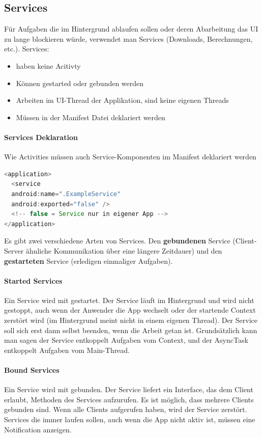 \subsection{Services}
Für Aufgaben die im Hintergrund ablaufen sollen oder deren Abarbeitung das UI zu lange blockieren würde, verwendet man Services (Downloads, Berechnungen, etc.). Services:
\begin{itemize}
\item haben keine Acitivty
\item Können gestarted oder gebunden werden
\item Arbeiten im UI-Thread der Applikation, sind keine eigenen Threads
\item Müssen in der Manifest Datei deklariert werden
\end{itemize}
\paragraph{Services Deklaration} Wie Activities müssen auch Service-Komponenten im Manifest deklariert werden
\begin{lstlisting}[language=java]
<application>
  <service 
  android:name=".ExampleService"
  android:exported="false" />
  <!-- false = Service nur in eigener App -->
</application>
\end{lstlisting}
Es gibt zwei verschiedene Arten von Services. Den \textbf{gebundenen} Service (Client-Server ähnliche Kommunikation über eine längere Zeitdauer) und den \textbf{gestarteten} Service (erledigen einmaliger Aufgaben).
\paragraph{Started Services} Ein Service wird mit  gestartet. Der Service läuft im Hintergrund und wird nicht gestoppt, auch wenn der Anwender die App wechselt oder der startende Context zerstört wird (im Hintergrund meint nicht in einem eigenen Thread). Der Service soll sich erst dann selbst beenden, wenn die Arbeit getan ist. Grundsätzlich kann man sagen der Service entkoppelt Aufgaben vom Context, und der AsyncTask entkoppelt Aufgaben vom Main-Thread.
\paragraph{Bound Services} Ein Service wird mit  gebunden. Der Service liefert ein Interface, das dem Client erlaubt, Methoden des Services aufzurufen. Es ist möglich, dass mehrere Clients gebunden sind. Wenn alle Clients  aufgerufen haben, wird der Service zerstört.
Services die immer laufen sollen, auch wenn die App nicht aktiv ist, müssen eine Notification anzeigen.
